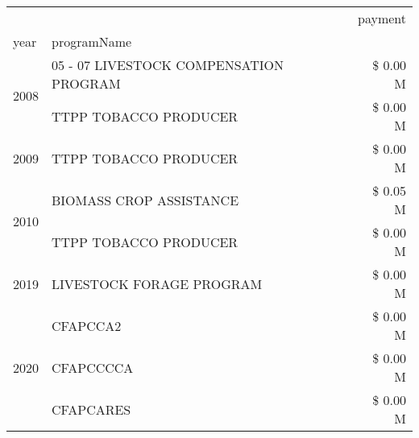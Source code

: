 \begin{tabular}{llr}
\toprule
 &  & payment \\
year & programName &  \\
\midrule
\multirow[t]{2}{*}{2008} & 05 - 07 LIVESTOCK COMPENSATION PROGRAM & \$ 0.00 M \\
 & TTPP TOBACCO PRODUCER & \$ 0.00 M \\
\cline{1-3}
2009 & TTPP TOBACCO PRODUCER & \$ 0.00 M \\
\cline{1-3}
\multirow[t]{2}{*}{2010} & BIOMASS CROP ASSISTANCE & \$ 0.05 M \\
 & TTPP TOBACCO PRODUCER & \$ 0.00 M \\
\cline{1-3}
2019 & LIVESTOCK FORAGE PROGRAM & \$ 0.00 M \\
\cline{1-3}
\multirow[t]{3}{*}{2020} & CFAPCCA2 & \$ 0.00 M \\
 & CFAPCCCCA & \$ 0.00 M \\
 & CFAPCARES & \$ 0.00 M \\
\cline{1-3}
\bottomrule
\end{tabular}
